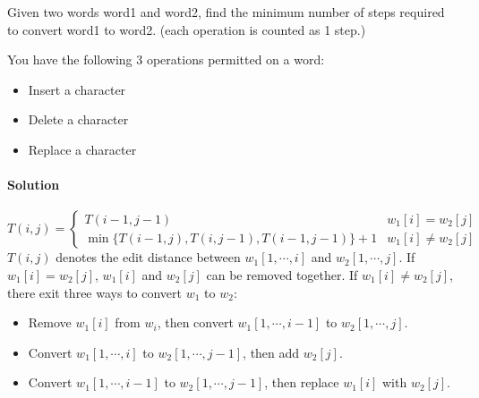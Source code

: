 Given two words word1 and word2, find the minimum number of steps required to convert word1 to word2. (each operation is counted as 1 step.)

You have the following 3 operations permitted on a word:
\begin{itemize}
    \item Insert a character
    \item Delete a character
    \item Replace a character
\end{itemize}

\paragraph{Solution}

\begin{equation*}
    T(i,j)=\begin{cases}
    T(i-1,j-1) & w_1[i]=w_2[j]\\
    \min\{T(i-1,j),T(i,j-1),T(i-1,j-1)\}+1 & w_1[i]\neq w_2[j]
    \end{cases}
\end{equation*}
$T(i,j)$ denotes the edit distance between $w_1[1,\cdots,i]$ and $w_2[1,\cdots,j]$. If $w_1[i]=w_2[j]$, $w_1[i]$ and $w_2[j]$ can be removed together. If $w_1[i]\neq w_2[j]$, there exit three ways to convert $w_1$ to $w_2$:
\begin{itemize}
    \item Remove $w_1[i]$ from $w_i$, then convert $w_1[1,\cdots,i-1]$ to $w_2[1,\cdots,j]$.
    \item Convert $w_1[1,\cdots,i]$ to $w_2[1,\cdots,j-1]$, then add $w_2[j]$.
    \item Convert $w_1[1,\cdots,i-1]$ to $w_2[1,\cdots,j-1]$, then replace $w_1[i]$ with $w_2[j]$.
\end{itemize}